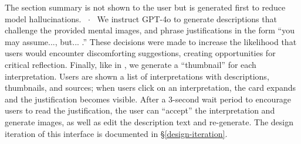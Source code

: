 The section summary is not shown to the user but is generated first to reduce model hallucinations.
~$\cdot$~
We instruct GPT-4o to generate descriptions that challenge the provided mental images, and phrase justifications in the form ``you may assume..., but... .'' These decisions were made to increase the likelihood that users would encounter discomforting suggestions, creating opportunities for critical reflection. 
Finally, like in , we generate a ``thumbnail'' for each interpretation.
Users are shown a list of interpretations with descriptions, thumbnails, and sources; when users click on an interpretation, the card expands and the justification becomes visible.
After a 3-second wait period to encourage users to read the justification, the user can ``accept'' the interpretation and generate images, as well as edit the description text and re-generate.
The design iteration of this interface is documented in \S\ref{design-iteration}.